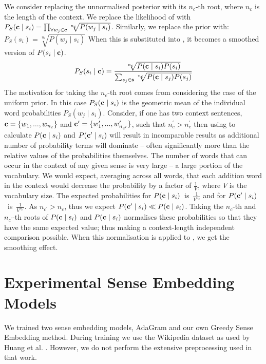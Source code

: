 {We consider replacing the unnormalised posterior with its $n_c$-th root, where $n_c$ is the length of the context.
We replace the likelihood of  with 
\(P_S(\mathbf{c} \mid s_{i})=\prod_{\forall w_{j}\in\mathbf{c}}\sqrt[n_c]{P(w_{j} \mid s_{i})}\).
Similarly, we replace the prior with:
\(P_S(s_{i})= \sqrt[n_c]{P(w_{j} \mid s_{i})}\)
When this is substituted into , it becomes a smoothed version of $P(s_{i} \mid \mathbf{c})$.
\begin{equation} \label{eq:generalwsdsmoothed}
P_S(s_{i}\mid\c) %
%
=\dfrac{\sqrt[n_c]{P(\c\mid s_{i})P(s_{i})}}
{\sum_{s_{j}\in\s} \sqrt[n_c]{P(\c \mid s_{j})P(s_{j})}} 
%
\end{equation}
The motivation for taking the $n_c$-th root comes from considering the case of the uniform prior.
In this case $P_S(\mathbf{c} \mid s_{i})$ is the geometric mean of the individual word probabilities $P_S(w_j \mid s_{i})$.
Consider, if one has two context sentences, $\mathbf{c}=\{w_1,...,w_{n_c}\}$ and $\mathbf{c}^\prime=\{w_1^\prime,...,w^\prime_{n_{c^\prime}}\}$, such that $n_c^\prime > n_c^\prime$
then using  to calculate $P(\mathbf{c} \mid s_{i})$ and $P(\mathbf{c}^\prime \mid s_{i})$ will  result in incomparable results as additional number of probability terms will dominate -- often significantly more than the relative values of the probabilities themselves.
The number of words that can occur in the context of any given sense is very large -- a large portion of the vocabulary.
We would expect, averaging across all words, that each addition word in the context would decrease the probability by a factor of $\frac{1}{V}$, where  $V$ is the vocabulary size. 
The expected probabilities for \mbox{$P(\mathbf{c} \mid s_{i})$ is $\frac{1}{V^{n_c}}$} and for \mbox{$P(\mathbf{c}^\prime \mid s_{i})$ is $\frac{1}{V^{n_{c^\prime}}}$}.
As $n_{c^\prime} > n_c$, thus we expect $P(\mathbf{c}^\prime \mid s_{i}) \ll P(\mathbf{c} \mid s_{i})$.
Taking the $n_{c}$-th and $n_{c^\prime}$-th roots of $P(\mathbf{c} \mid s_{i})$ and $P(\mathbf{c} \mid s_{i})$ normalises these probabilities so that they have the same expected value; thus making a context-length independent comparison possible.
When this normalisation is applied to , we get the smoothing effect.


\section{Experimental Sense Embedding Models} 
\label{Models}
We trained two sense embedding models, AdaGram \parencite{AdaGrams} and our own Greedy Sense Embedding method. 
During training we use the Wikipedia dataset as used by Huang et al. \parencite{Huang2012}.
However, we do not perform the extensive preprocessing used in that work.

}
